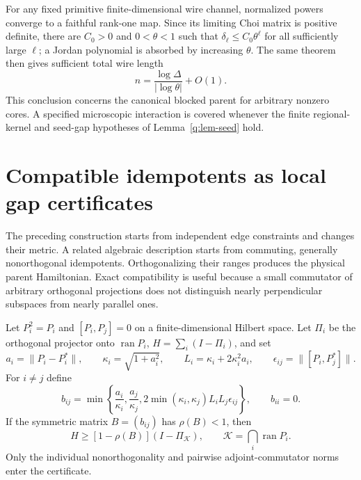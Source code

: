For any fixed primitive finite-dimensional wire channel, normalized
powers converge to a faithful rank-one map.  Since its limiting Choi
matrix is positive definite, there are $C_0>0$ and $0<\theta<1$ such
that $\delta_\ell\leq C_0\theta^\ell$ for all sufficiently large
$\ell$; a Jordan polynomial is absorbed by increasing $\theta$.
The same theorem then gives sufficient total wire length
\[
 n=\frac{\log\Delta}{|\log\theta|}+O(1).
\]
This conclusion concerns the canonical blocked parent for arbitrary
nonzero cores.  A specified microscopic interaction is covered whenever
the finite regional-kernel and seed-gap hypotheses of
Lemma~\ref{q:lem-seed} hold.

\section{Compatible idempotents as local gap certificates}
\label{q:sec-oblique}

The preceding construction starts from independent edge constraints and
changes their metric.  A related algebraic description starts from
commuting, generally nonorthogonal idempotents.  Orthogonalizing their
ranges produces the physical parent Hamiltonian.  Exact compatibility
is useful because a small commutator of arbitrary orthogonal projections
does not distinguish nearly perpendicular subspaces from nearly parallel
ones.

\begin{theorem}
\label{q:thm-oblique}
Let $P_i^2=P_i$ and $[P_i,P_j]=0$ on a finite-dimensional Hilbert space.
Let $\Pi_i$ be the orthogonal projector onto $\operatorname{ran}P_i$,
$H=\sum_i(I-\Pi_i)$, and set
\[
 a_i=\|P_i-P_i^*\|,\qquad
 \kappa_i=\sqrt{1+a_i^2},\qquad
 L_i=\kappa_i+2\kappa_i^2a_i,\qquad
 \epsilon_{ij}=\|[P_i,P_j^*]\|.
\]
For $i\ne j$ define
\begin{equation}
 b_{ij}=\min\left\{
 \frac{a_i}{\kappa_i},\frac{a_j}{\kappa_j},
 2\min(\kappa_i,\kappa_j)L_iL_j\epsilon_{ij}\right\},
 \qquad b_{ii}=0.
 \label{q:oblique-b}
\end{equation}
If the symmetric matrix $B=(b_{ij})$ has $\rho(B)<1$, then
\[
 H\geq[1-\rho(B)](I-\Pi_{\mathcal K}),\qquad
 \mathcal K=\bigcap_i\operatorname{ran}P_i.
\]
Only the individual nonorthogonality and pairwise adjoint-commutator
norms enter the certificate.
\end{theorem}

